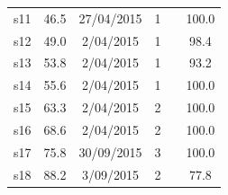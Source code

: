 \begin{table}
\begin{tabular}{c|ccccc}
s11                                                 & 46.5                                                    & 27/04/2015                                                & 1                                                       &                         & 100.0                                                                   \\ 
s12                                                 & 49.0                                                    & 2/04/2015                                                 & 1                                                       &                         & 98.4                                                                    \\ 
s13                                                 & 53.8                                                    & 2/04/2015                                                 & 1                                                       &                         & 93.2                                                                    \\ 
s14                                                 & 55.6                                                    & 2/04/2015                                                 & 1                                                       &                         & 100.0                                                                   \\ 
s15                                                 & 63.3                                                    & 2/04/2015                                                 & 2                                                       &                         & 100.0                                                            \\ 
s16                                                 & 68.6                                                    & 2/04/2015                                                 & 2                                                       &                         & 100.0                                                            \\ 
s17                                                 & 75.8                                                    & 30/09/2015                                                & 3                                                       &                         & 100.0                                                               \\ 
s18                                                 & 88.2                                                    & 3/09/2015                                                 & 2                                                       &                         & 77.8                                                             \\ 

\end{tabular}
\end{table}
